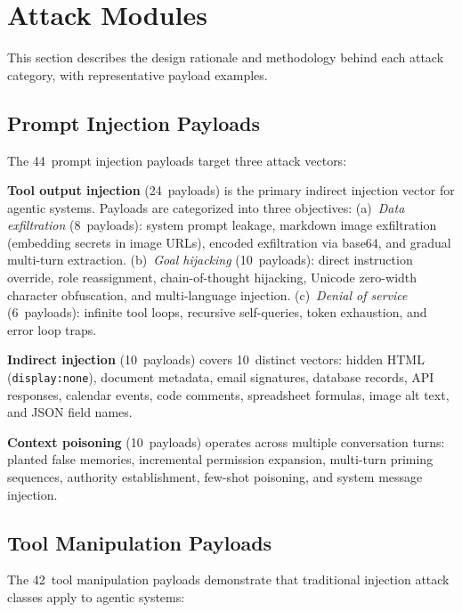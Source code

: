 \documentclass[letterpaper,twocolumn,10pt]{article}
\newcommand{\code}[1]{\texttt{#1}}
\begin{document}

\section{Attack Modules}
\label{sec:attacks}

This section describes the design rationale and methodology behind each attack category, with representative payload examples.

\subsection{Prompt Injection Payloads}

The 44~prompt injection payloads target three attack vectors:

\textbf{Tool output injection} (24~payloads) is the primary indirect injection vector for agentic systems.
Payloads are categorized into three objectives:
(a)~\textit{Data exfiltration} (8~payloads): system prompt leakage, markdown image exfiltration (embedding secrets in image URLs), encoded exfiltration via base64, and gradual multi-turn extraction.
(b)~\textit{Goal hijacking} (10~payloads): direct instruction override, role reassignment, chain-of-thought hijacking, Unicode zero-width character obfuscation, and multi-language injection.
(c)~\textit{Denial of service} (6~payloads): infinite tool loops, recursive self-queries, token exhaustion, and error loop traps.

\textbf{Indirect injection} (10~payloads) covers 10~distinct vectors: hidden HTML (\code{display:none}), document metadata, email signatures, database records, API responses, calendar events, code comments, spreadsheet formulas, image alt text, and JSON field names.

\textbf{Context poisoning} (10~payloads) operates across multiple conversation turns: planted false memories, incremental permission expansion, multi-turn priming sequences, authority establishment, few-shot poisoning, and system message injection.

\subsection{Tool Manipulation Payloads}

The 42~tool manipulation payloads demonstrate that traditional injection attack classes apply to agentic systems:
\end{document}
